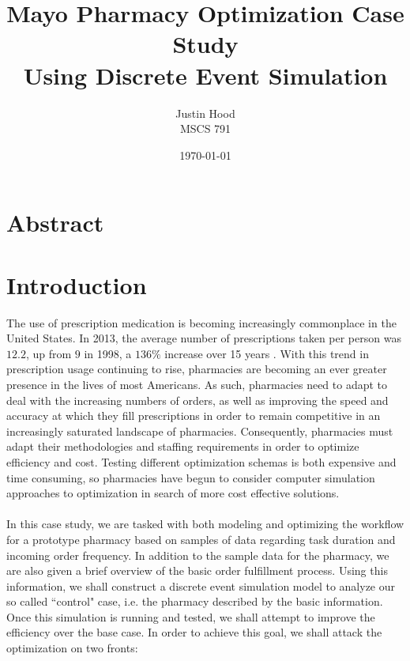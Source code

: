 \documentclass[10pt]{report}            %
\title{\bf Mayo Pharmacy Optimization Case Study\\
\large Using Discrete Event Simulation}  %
\author{Justin Hood\\
MSCS 791}              %
\date{\today}                           %
\begin{document}
\maketitle                              %
\setcounter{page}{2}                    %
\newpage
\section*{Abstract}
\section*{Introduction}                %
The use of prescription medication is becoming increasingly commonplace in the United States. In 2013, the average number of prescriptions taken per person was $12.2$, up from $9$ in 1998, a $136\%$ increase over 15 years \cite{georgetown}\cite{statistica}. With this trend in prescription usage continuing to rise, pharmacies are becoming an ever greater presence in the lives of most Americans. As such, pharmacies need to adapt to deal with the increasing numbers of orders, as well as improving the speed and accuracy at which they fill prescriptions in order to remain competitive in an increasingly saturated landscape of pharmacies.  Consequently, pharmacies must adapt their methodologies and staffing requirements in order to optimize efficiency and cost. Testing different optimization schemas is both expensive and time consuming, so pharmacies have begun to consider computer simulation approaches to optimization in search of more cost effective solutions.\\\hfill\\
In this case study, we are tasked with both modeling and optimizing the workflow for a prototype pharmacy based on samples of data regarding task duration and incoming order frequency. In addition to the sample data for the pharmacy, we are also given a brief overview of the basic order fulfillment process. Using this information, we shall construct a discrete event simulation model to analyze our so called ``control" case, i.e. the pharmacy described by the basic information. Once this simulation is running and tested, we shall attempt to improve the efficiency over the base case. In order to achieve this goal, we shall attack the optimization on two fronts:
\end{document}
